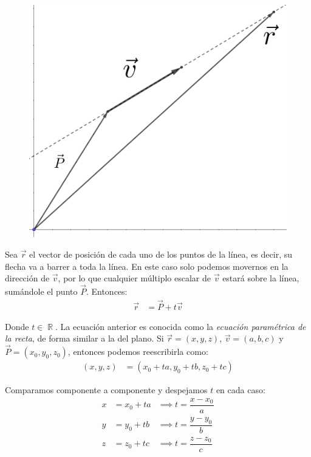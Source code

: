 \documentclass[12pt, fleqn]{report}                             %
\DeclareMathOperator \Reals        {\mathbb{R}}                 %
\begin{document}
    		\begin{figure}[H]
    			\centering
    			\includegraphics[scale=1.2]{line.png}
    		\end{figure}
        
        	Sea $\vec{r}$ el vector de posición de cada uno de los puntos de la línea, es decir, su flecha va a barrer a toda la línea. En este caso solo podemos movernos en la dirección de $\vec{v}$, por lo que cualquier múltiplo escalar de $\vec{v}$ estará sobre la línea, sumándole el punto $\vec{P}$. Entonces:
        	\begin{align}
	        	\vec{r} &= \vec{P} + t\vec{v} \label{lineEquationGeneral}
        	\end{align}
        	
        	Donde $t \in \Reals$. La ecuación anterior es conocida como la \emph{ecuación paramétrica de la recta}, de forma similar a la del plano. Si $\vec{r}=(x,y,z)$, $\vec{v}=(a,b,c)$ y $\vec{P}=(x_0,y_0,z_0)$, entonces podemos reescribirla como:
        	\begin{align*}
	        	(x, y, z) &= (x_0 + ta, y_0 + tb, z_0 + tc)
        	\end{align*}
        	
        	Comparamos componente a componente y despejamos $t$ en cada caso:
        	\begin{align*}
	        	x &= x_0 + ta &\implies t = \dfrac{x - x_0}{a} \\
	        	y &= y_0 + tb &\implies t = \dfrac{y - y_0}{b} \\
	        	z &= z_0 + tc &\implies t = \dfrac{z - z_0}{c}
        	\end{align*}
        	
\end{document}
